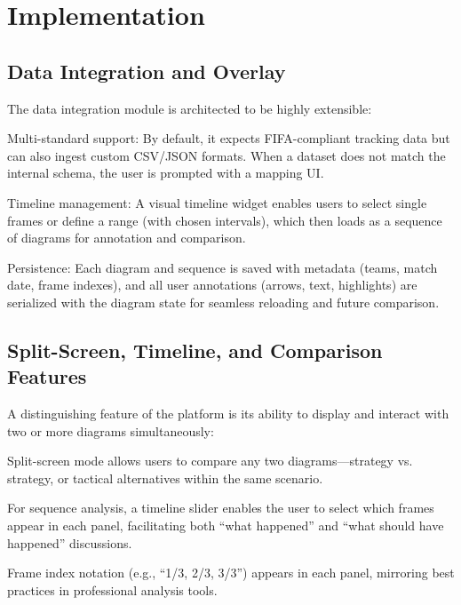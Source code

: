 \documentclass[11pt,a4paper,openright]{report}
\begin{document}

\chapter{Implementation}

\section{Data Integration and Overlay}

The data integration module is architected to be highly extensible:

Multi-standard support: By default, it expects FIFA-compliant tracking data but can also ingest custom CSV/JSON formats. When a dataset does not match the internal schema, the user is prompted with a mapping UI.

Timeline management: A visual timeline widget enables users to select single frames or define a range (with chosen intervals), which then loads as a sequence of diagrams for annotation and comparison.

Persistence: Each diagram and sequence is saved with metadata (teams, match date, frame indexes), and all user annotations (arrows, text, highlights) are serialized with the diagram state for seamless reloading and future comparison.

\section{Split-Screen, Timeline, and Comparison Features}

A distinguishing feature of the platform is its ability to display and interact with two or more diagrams simultaneously:

Split-screen mode allows users to compare any two diagrams—strategy vs. strategy, or tactical alternatives within the same scenario.

For sequence analysis, a timeline slider enables the user to select which frames appear in each panel, facilitating both “what happened” and “what should have happened” discussions.

Frame index notation (e.g., “1/3, 2/3, 3/3”) appears in each panel, mirroring best practices in professional analysis tools.
\end{document}
